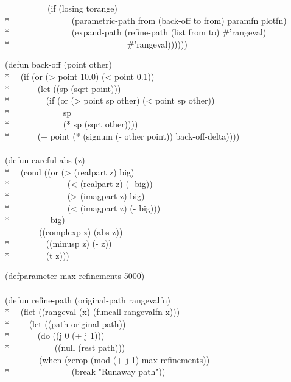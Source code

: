\begin{new}
\begin{lisp}
~~~~~~~~~~(if (losing torange) \\*
~~~~~~~~~~~~~~(parametric-path from (back-off to from) paramfn plotfn) \\*
~~~~~~~~~~~~~~(expand-path (refine-path (list from to) \#'rangeval) \\*
~~~~~~~~~~~~~~~~~~~~~~~~~~~\#'rangeval))))))
\end{lisp}
 \newpage%
\begin{lisp}
(defun back-off (point other) \\*
~~(if (or (> point 10.0) (< point 0.1)) \\*
~~~~~~(let ((sp (sqrt point))) \\*
~~~~~~~~(if (or (> point sp other) (< point sp other)) \\*
~~~~~~~~~~~~sp \\*
~~~~~~~~~~~~(* sp (sqrt other)))) \\*
~~~~~~(+ point (* (signum (- other point)) back-off-delta)))) \\
\\
(defun careful-abs (z) \\*
~~(cond ((or (> (realpart z) big) \\*
~~~~~~~~~~~~~(< (realpart z) (- big)) \\*
~~~~~~~~~~~~~(> (imagpart z) big) \\*
~~~~~~~~~~~~~(< (imagpart z) (- big))) \\*
~~~~~~~~~big) \\
~~~~~~~~((complexp z) (abs z)) \\*
~~~~~~~~((minusp z) (- z)) \\*
~~~~~~~~(t z))) \\      %
\end{lisp}
\begin{lisp}
(defparameter max-refinements 5000) \\
\\
(defun refine-path (original-path rangevalfn) \\*
~~(flet ((rangeval (x) (funcall rangevalfn x))) \\*
~~~~(let ((path original-path)) \\*
~~~~~~(do ((j 0 (+ j 1))) \\*
~~~~~~~~~~((null (rest path))) \\
~~~~~~~~(when (zerop (mod (+ j 1) max-refinements)) \\*
~~~~~~~~~~~~~~(break "Runaway path")) \\

\end{lisp}
\end{new}
